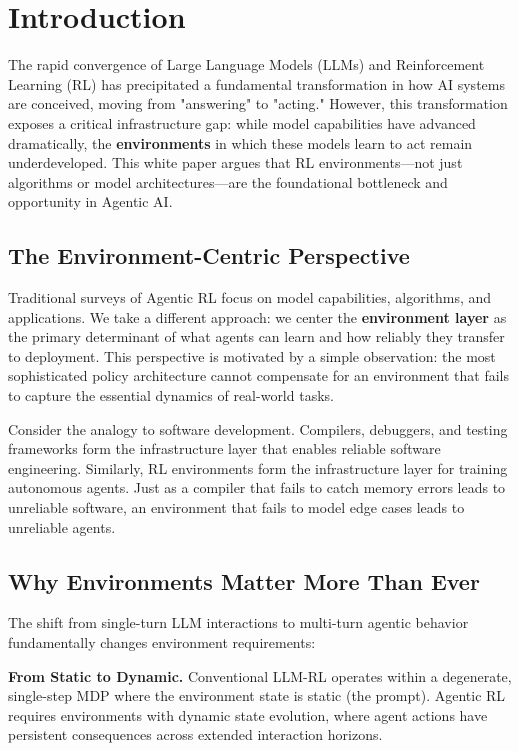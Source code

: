 
\section{Introduction}

The rapid convergence of Large Language Models (LLMs) and Reinforcement Learning (RL) has precipitated a fundamental transformation in how AI systems are conceived, moving from "answering" to "acting." However, this transformation exposes a critical infrastructure gap: while model capabilities have advanced dramatically, the \textbf{environments} in which these models learn to act remain underdeveloped. This white paper argues that RL environments---not just algorithms or model architectures---are the foundational bottleneck and opportunity in Agentic AI.

\subsection{The Environment-Centric Perspective}

Traditional surveys of Agentic RL focus on model capabilities, algorithms, and applications. We take a different approach: we center the \textbf{environment layer} as the primary determinant of what agents can learn and how reliably they transfer to deployment. This perspective is motivated by a simple observation: the most sophisticated policy architecture cannot compensate for an environment that fails to capture the essential dynamics of real-world tasks.

Consider the analogy to software development. Compilers, debuggers, and testing frameworks form the infrastructure layer that enables reliable software engineering. Similarly, RL environments form the infrastructure layer for training autonomous agents. Just as a compiler that fails to catch memory errors leads to unreliable software, an environment that fails to model edge cases leads to unreliable agents.

\subsection{Why Environments Matter More Than Ever}

The shift from single-turn LLM interactions to multi-turn agentic behavior fundamentally changes environment requirements:

\textbf{From Static to Dynamic.} Conventional LLM-RL operates within a degenerate, single-step MDP where the environment state is static (the prompt). Agentic RL requires environments with dynamic state evolution, where agent actions have persistent consequences across extended interaction horizons.

